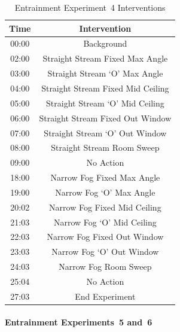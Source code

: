 \documentclass[12pt,oneside]{book}
\begin{document}
\begin{table}[H]
	\centering
	\caption{Entrainment Experiment~4 Interventions}
	\begin{tabular}{|c|c|} 
		\hline
 		Time 	& 	Intervention 	\\ \hline \hline
 		00:00	&	Background 	\\ \hline
		02:00	&	Straight Stream Fixed Max Angle 	\\ \hline
		03:00	&	Straight Stream `O' Max Angle 	\\ \hline
		04:00	&	Straight Stream Fixed Mid Ceiling 	\\ \hline
		05:00	&	Straight Stream `O' Mid Ceiling 	\\ \hline
		06:00	&	Straight Stream Fixed Out Window 	\\ \hline
		07:00	&	Straight Stream `O' Out Window 	\\ \hline
		08:00	&	Straight Stream Room Sweep 	\\ \hline
		09:00	&	No Action 	\\ \hline
		18:00	&	Narrow Fog Fixed Max Angle 	\\ \hline
		19:00	&	Narrow Fog `O' Max Angle 	\\ \hline
		20:02	&	Narrow Fog Fixed Mid Ceiling 	\\ \hline
		21:03	&	Narrow Fog `O' Mid Ceiling 	\\ \hline
		22:03	&	Narrow Fog Fixed Out Window 	\\ \hline
		23:03	&	Narrow Fog `O' Out Window 	\\ \hline
		24:03	&	Narrow Fog Room Sweep 	\\ \hline
		25:04	&	No Action 	\\ \hline
		27:03	&	End Experiment 	\\ \hline
	\end{tabular}
	\label{Table:EntExp4_Interventions}
\end{table}

\FloatBarrier

\paragraph{Entrainment Experiments~5 and~6} \mbox{}

\end{document}
